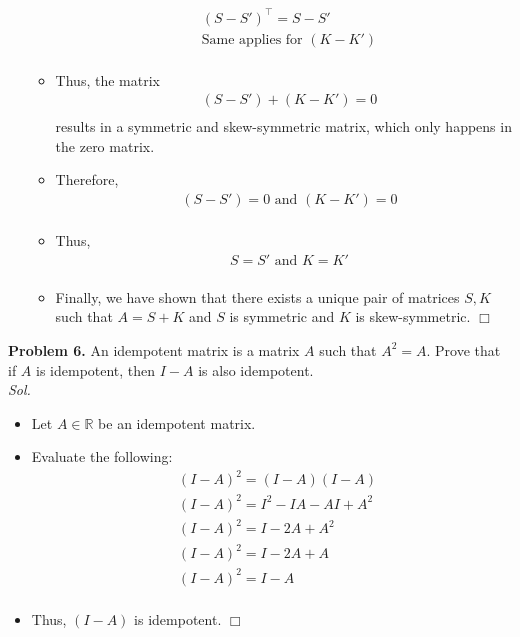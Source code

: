 \documentclass[11pt]{article}
\begin{document}
\begin{itemize}
\begin{itemize}
\begin{align*}
        & (S - S')^\top = S - S' \\
        & \text{Same applies for } (K - K') \\
      \end{align*}
    \item[]  Thus, the matrix \begin{align*}
      & (S - S') + (K - K') = 0 \\
      \end{align*} results in a symmetric and skew-symmetric matrix, which only happens in the zero matrix.
    \item[] Therefore, 
      \begin{align*}
        & (S - S') = 0 \text{ and } (K - K') = 0 \\
      \end{align*}
    \item[] Thus, \begin{align*}
      & S = S' \text{ and } K = K' \\
      \end{align*}
    \item[] Finally, we have shown that there exists a unique pair of matrices $S, K$ such that
      $A = S + K$ and $S$ is symmetric and $K$ is skew-symmetric. $\Box$

    \end{itemize}
\end{itemize}
\clearpage
	{\bf Problem 6.} An idempotent matrix is a matrix $A$ such that $A^2 = A$.
  Prove that if $A$ is idempotent, then $I - A$ is also idempotent.\\
  \textit{ Sol. }
  \begin{itemize}
    \item[] Let $A \in \mathbb{R}$ be an idempotent matrix.
    \item[] Evaluate the following: \begin{align*}
        & (I - A)^2 = (I - A)(I - A) \\
        & (I - A)^2 = I^2 - IA - AI + A^2 \\
        & (I - A)^2 = I - 2A + A^2 \\
        & (I - A)^2 = I - 2A + A \\
        & (I - A)^2 = I - A \\
      \end{align*}
    \item[] Thus, $(I - A)$ is idempotent. $\Box$
  \end{itemize}
  
\end{document}
